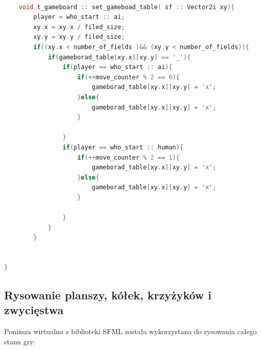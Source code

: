 \documentclass[12pt]{article}
\begin{document}
    \begin{lstlisting}[language=C++, caption=set\_gameboad\_table()]
    
    void t_gameboard :: set_gameboad_table( sf :: Vector2i xy){
        player = who_start :: ai;
        xy.x = xy.x / filed_size;
        xy.y = xy.y / filed_size;
        if((xy.x < number_of_fields )&& (xy.y < number_of_fields)){
            if(gameborad_table[xy.x][xy.y] == '_'){
                if(player == who_start :: ai){
                    if(++move_counter % 2 == 0){
                        gameborad_table[xy.x][xy.y] = 'x';
                    }else{
                        gameborad_table[xy.x][xy.y] = 'x';
                    }

                }
                if(player == who_start :: human){
                    if(++move_counter % 2 == 1){
                        gameborad_table[xy.x][xy.y] = 'x';
                    }else{
                        gameborad_table[xy.x][xy.y] = 'x';
                    }

                }
            }
        }
        
    
}


    \end{lstlisting}
    

    \subsection{Rysowanie planszy, kółek, krzyżyków i zwycięstwa}

        Poniższa wirtualna z biblioteki SFML została wykorzystana do rysowania całego stanu gry:
\end{document}
